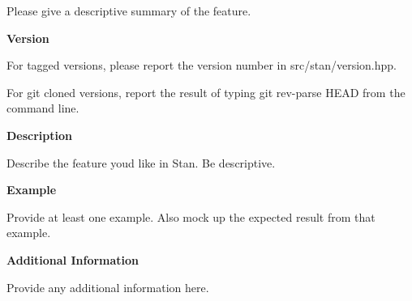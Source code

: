 Please give a descriptive summary of the feature.

{\bfseries Version}

For tagged versions, please report the version number in {\ttfamily src/stan/version.\+hpp}.

For git cloned versions, report the result of typing {\ttfamily git rev-\/parse H\+E\+A\+D} from the command line.

{\bfseries Description}

Describe the feature you\textquotesingle{}d like in Stan. Be descriptive.

{\bfseries Example}

Provide at least one example. Also mock up the expected result from that example.

{\bfseries Additional Information}

Provide any additional information here. 